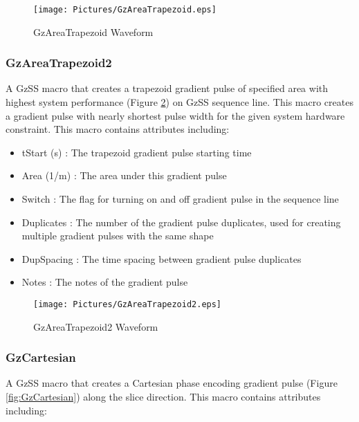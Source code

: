 \documentclass{book}%
\begin{document}
\begin{figure}[htbp]
	\centering
		\texttt{[image: Pictures/GzAreaTrapezoid.eps]}
	\caption{GzAreaTrapezoid Waveform}
	\label{fig:GzAreaTrapezoid}
\end{figure}		

\subsubsection{GzAreaTrapezoid2}

A GzSS macro that creates a trapezoid gradient pulse of specified area with highest system performance (Figure \ref{fig:GzAreaTrapezoid2}) on GzSS sequence line. This macro creates a gradient pulse with nearly shortest pulse width for the given system hardware constraint. This macro contains attributes including:

\begin{itemize}
	\item tStart (s) : The trapezoid gradient pulse starting time
	\item Area (1/m) : The area under this gradient pulse
	\item Switch : The flag for turning on and off gradient pulse in the sequence line
	\item Duplicates : The number of the gradient pulse duplicates, used for creating multiple gradient pulses with the same shape
	\item DupSpacing : The time spacing between gradient pulse duplicates
	\item Notes : The notes of the gradient pulse 
\end{itemize}

\begin{figure}[htbp]
	\centering
		\texttt{[image: Pictures/GzAreaTrapezoid2.eps]}
	\caption{GzAreaTrapezoid2 Waveform}
	\label{fig:GzAreaTrapezoid2}
\end{figure}

\subsubsection{GzCartesian}

A GzSS macro that creates a Cartesian phase encoding gradient pulse (Figure \ref{fig:GzCartesian}) along the slice direction. This macro contains attributes including:
\end{document}
